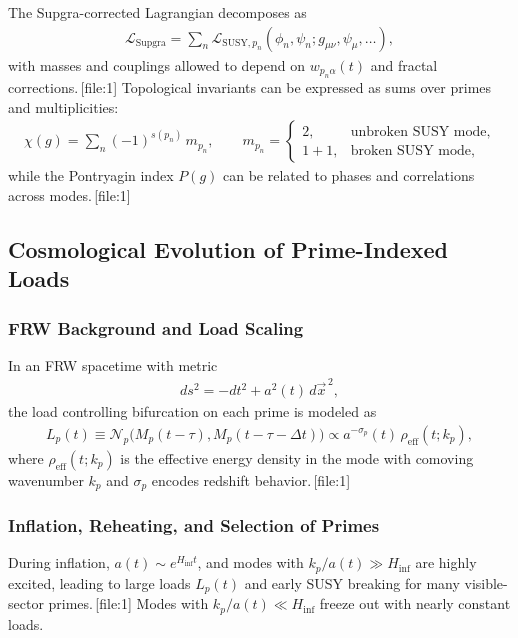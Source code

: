 \documentclass[11pt]{article}
\begin{document}
The Supgra-corrected Lagrangian decomposes as
\begin{align}
\mathcal{L}_{\mathrm{Supgra}}
=
\sum_n
\mathcal{L}_{\mathrm{SUSY},p_n}(\phi_n,\psi_n;g_{\mu\nu},\psi_\mu,\dots),
\end{align}
with masses and couplings allowed to depend on \(w_{p_n\alpha}(t)\) and fractal corrections.\,[file:1] Topological invariants can be expressed as sums over primes and multiplicities:
\begin{align}
\chi(g) = \sum_n (-1)^{s(p_n)}\,m_{p_n},\qquad
m_{p_n} =
\begin{cases}
2,& \text{unbroken SUSY mode,}\\
1+1,& \text{broken SUSY mode,}
\end{cases}
\end{align}
while the Pontryagin index \(P(g)\) can be related to phases and correlations across modes.\,[file:1]

\subsection{Cosmological Evolution of Prime-Indexed Loads}

\subsubsection{FRW Background and Load Scaling}

In an FRW spacetime with metric
\begin{align}
ds^2 = -dt^2 + a^2(t)\,d\vec{x}^{\,2},
\end{align}
the load controlling bifurcation on each prime is modeled as
\begin{align}
L_p(t) \equiv \mathcal{N}_p\bigl(M_p(t-\tau),M_p(t-\tau-\Delta t)\bigr)
\propto a^{-\sigma_p}(t)\,\rho_{\mathrm{eff}}(t;k_p),
\end{align}
where \(\rho_{\mathrm{eff}}(t;k_p)\) is the effective energy density in the mode with comoving wavenumber \(k_p\) and \(\sigma_p\) encodes redshift behavior.\,[file:1]

\subsubsection{Inflation, Reheating, and Selection of Primes}

During inflation, \(a(t)\sim e^{H_{\mathrm{inf}} t}\), and modes with \(k_p/a(t)\gg H_{\mathrm{inf}}\) are highly excited, leading to large loads \(L_p(t)\) and early SUSY breaking for many visible-sector primes.\,[file:1] Modes with \(k_p/a(t)\ll H_{\mathrm{inf}}\) freeze out with nearly constant loads.
\end{document}
